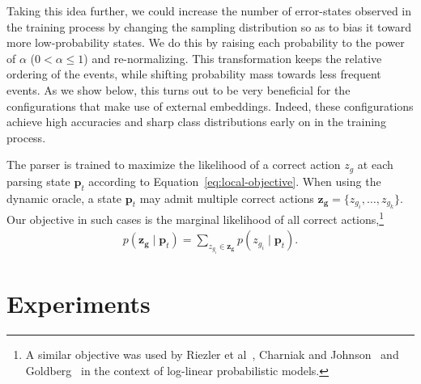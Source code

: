 \documentclass[11pt]{article}
\newcommand{\ignore}[1]{}
\newcommand{\nascomment}[1]{\textcolor{blue}{\textbf{[#1 --\textsc{nas}]}}}
\newcommand{\ygcomment}[1]{\textcolor{red}{\textbf{[#1 --\textsc{yg}]}}}
\begin{document}
Taking this idea further, we could increase the number of error-states observed
in the training process by changing the sampling distribution so
as to bias it toward more low-probability states. We do this by raising each
probability to the power of $\alpha$ ($0 < \alpha \leq 1$) and
re-normalizing. 
This transformation keeps the relative ordering of the events, while shifting
probability mass towards less frequent events.  As we show below, this turns out
to be very beneficial for the configurations that make use of external embeddings.
Indeed, these configurations achieve high accuracies and sharp class distributions 
early on in the training process.

The parser is trained to maximize the likelihood of a correct action $z_g$
at each parsing state $\mathbf{p}_t$ according to Equation~\ref{eq:local-objective}.  When using the dynamic oracle, a state $\mathbf{p}_t$
may admit multiple correct actions $\boldsymbol{z_g} = \{z_{g_i}, \ldots, z_{g_k}\}$. Our
objective in such cases is the marginal likelihood of all correct actions,\footnote{A similar objective was used by Riezler et
al~,
Charniak and Johnson~ and Goldberg~ in the
context of log-linear probabilistic models.
}
\begin{align}
    p(\boldsymbol{z_g} \mid \mathbf{p}_t) = \sum_{z_{g_i} \in \boldsymbol{z_g}}
    p(z_{g_i} \mid \mathbf{p}_t) .
\end{align}
\ignore{\nascomment{small notational change here to boldsymbol rather than
  mathbf for consistency with what we said in the ``Notation'' section}}

\section{Experiments}
\end{document}
